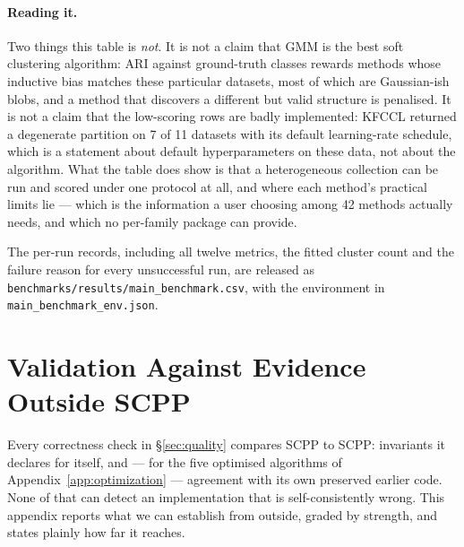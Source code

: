 \documentclass[twoside,11pt]{article}
\begin{document}


\paragraph{Reading it.} Two things this table is \emph{not}. It is not a
claim that GMM is the best soft clustering algorithm: ARI against
ground-truth classes rewards methods whose inductive bias matches these
particular datasets, most of which are Gaussian-ish blobs, and a method that
discovers a different but valid structure is penalised. It is not a claim
that the low-scoring rows are badly implemented: KFCCL returned a degenerate
partition on 7 of 11 datasets with its default learning-rate schedule, which
is a statement about default hyperparameters on these data, not about the
algorithm. What the table does show is that a heterogeneous collection can be
run and scored under one protocol at all, and where each method's practical
limits lie --- which is the information a user choosing among 42 methods
actually needs, and which no per-family package can provide.

The per-run records, including all twelve metrics, the fitted cluster count
and the failure reason for every unsuccessful run, are released as
\texttt{benchmarks/results/main\_benchmark.csv}, with the environment in
\texttt{main\_benchmark\_env.json}.

\section{Validation Against Evidence Outside SCPP}\label{app:external}

Every correctness check in \S\ref{sec:quality} compares SCPP to SCPP:
invariants it declares for itself, and --- for the five optimised algorithms
of Appendix~\ref{app:optimization} --- agreement with its own preserved
earlier code. None of that can detect an implementation that is
self-consistently wrong. This appendix reports what we can establish from
outside, graded by strength, and states plainly how far it reaches.
\end{document}
